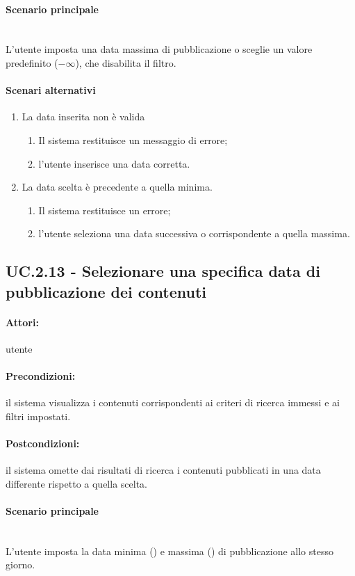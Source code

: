 \documentclass[10pt,a4paper,headinclude,footinclude,hidelinks]{scrreprt} %
\begin{document}
	\paragraph{Scenario principale} \hfill \\
	L'utente imposta una data massima di pubblicazione o sceglie un valore predefinito ($-\infty$), che disabilita il filtro.
	\paragraph{Scenari alternativi}
	\begin{enumerate}
	\item La data inserita non è valida
		\begin{enumerate}
		\item Il sistema restituisce un messaggio di errore;
		\item l'utente inserisce una data corretta.
		\end{enumerate}
	\item La data scelta è precedente a quella minima.
		\begin{enumerate}
		\item Il sistema restituisce un errore;
		\item l'utente seleziona una data successiva o corrispondente a quella massima.
		\end{enumerate}
	\end{enumerate}

	\subsection[UC.2.13]{UC.2.13 - Selezionare una specifica data di pubblicazione dei contenuti}
	\label{ch:stage:ar:uc:2_13}
	\paragraph{Attori:} utente
	\paragraph{Precondizioni:} il sistema visualizza i contenuti corrispondenti ai criteri di ricerca immessi e ai filtri impostati.
	\paragraph{Postcondizioni:} il sistema omette dai risultati di ricerca i contenuti pubblicati in una data differente rispetto a quella scelta.
	\paragraph{Scenario principale} \hfill \\
	L'utente imposta la data minima () e massima () di pubblicazione allo stesso giorno.
\end{document}
